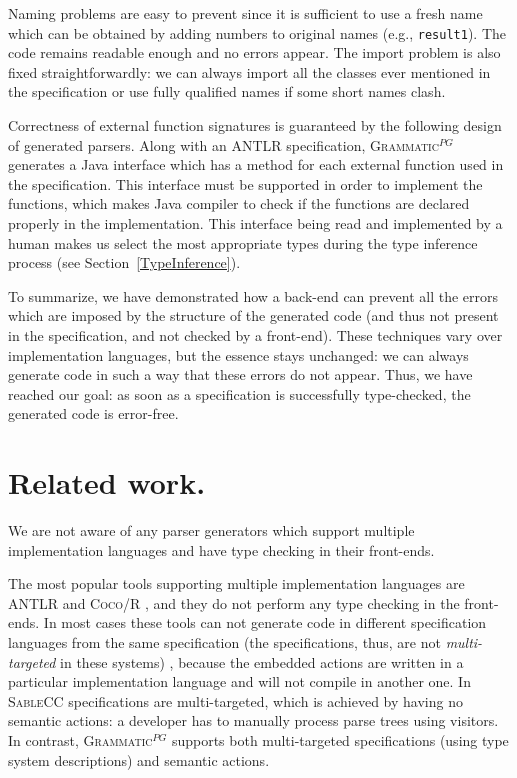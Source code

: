 \documentclass{informat} %
\newcommand{\secref}[1]{Section~\ref{#1}}
\newcommand{\tool}[1]{\textsc{#1}}
\newcommand{\ATF}{\textsc{Grammatic}$^{PG}$}
\begin{document}
{Naming problems are easy to prevent since it is sufficient to use a fresh name which can be obtained by adding numbers to original names (e.g., \texttt{result1}). The code remains readable enough and no errors appear.  
The import problem is also fixed straightforwardly: we can always import all the classes ever mentioned in the specification or use fully qualified names if some short names clash.

Correctness of external function signatures is guaranteed by the following design of generated parsers. Along with an \tool{ANTLR} specification, \ATF{} generates a Java interface which has a method for each external function used in the specification. This interface must be supported in order to implement the functions, which makes Java compiler to check if the functions are declared properly in the implementation. This interface being read and implemented by a human makes us select the most appropriate types during the type inference process (see \secref{TypeInference}).

To summarize, we have demonstrated how a back-end can prevent all the errors which are imposed by the structure of the generated code (and thus not present in the specification, and not checked by a front-end). These techniques vary over implementation languages, but the essence stays unchanged: we can always generate code in such a way that these errors do not appear.
Thus, we have reached our goal: as soon as a specification is successfully type-checked, the generated code is error-free.
}

\section{Related work.}\label{RelatedWork}

We are not aware of any parser generators which support multiple implementation languages and have type checking in their front-ends.

The most popular tools supporting multiple implementation languages are \tool{ANTLR} \cite{ANTLR} and \tool{Coco/R} \cite{Coco/R}, and they do not perform any type checking in the front-ends. In most cases these tools can not generate code in different specification languages from the same specification (the specifications, thus, are not \emph{multi-targeted} in these systems) , because the embedded actions are written in a particular implementation language and will not compile in another one. In \tool{SableCC} \cite{SableCC} specifications are multi-targeted, which is achieved by having no semantic actions: a developer has to manually process parse trees using visitors. In contrast, \ATF{} supports both multi-targeted specifications (using type system descriptions) and semantic actions.
\end{document}

